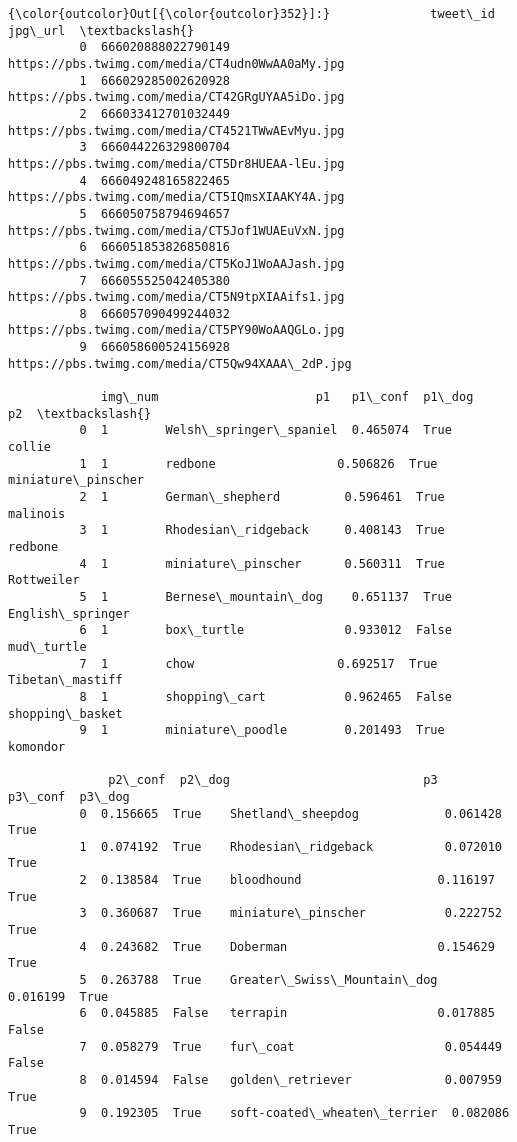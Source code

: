 \documentclass[11pt]{article}
\begin{document}
\begin{Verbatim}[commandchars=\\\{\}]
{\color{outcolor}Out[{\color{outcolor}352}]:}              tweet\_id                                          jpg\_url  \textbackslash{}
          0  666020888022790149  https://pbs.twimg.com/media/CT4udn0WwAA0aMy.jpg   
          1  666029285002620928  https://pbs.twimg.com/media/CT42GRgUYAA5iDo.jpg   
          2  666033412701032449  https://pbs.twimg.com/media/CT4521TWwAEvMyu.jpg   
          3  666044226329800704  https://pbs.twimg.com/media/CT5Dr8HUEAA-lEu.jpg   
          4  666049248165822465  https://pbs.twimg.com/media/CT5IQmsXIAAKY4A.jpg   
          5  666050758794694657  https://pbs.twimg.com/media/CT5Jof1WUAEuVxN.jpg   
          6  666051853826850816  https://pbs.twimg.com/media/CT5KoJ1WoAAJash.jpg   
          7  666055525042405380  https://pbs.twimg.com/media/CT5N9tpXIAAifs1.jpg   
          8  666057090499244032  https://pbs.twimg.com/media/CT5PY90WoAAQGLo.jpg   
          9  666058600524156928  https://pbs.twimg.com/media/CT5Qw94XAAA\_2dP.jpg   
          
             img\_num                      p1   p1\_conf  p1\_dog                  p2  \textbackslash{}
          0  1        Welsh\_springer\_spaniel  0.465074  True    collie               
          1  1        redbone                 0.506826  True    miniature\_pinscher   
          2  1        German\_shepherd         0.596461  True    malinois             
          3  1        Rhodesian\_ridgeback     0.408143  True    redbone              
          4  1        miniature\_pinscher      0.560311  True    Rottweiler           
          5  1        Bernese\_mountain\_dog    0.651137  True    English\_springer     
          6  1        box\_turtle              0.933012  False   mud\_turtle           
          7  1        chow                    0.692517  True    Tibetan\_mastiff      
          8  1        shopping\_cart           0.962465  False   shopping\_basket      
          9  1        miniature\_poodle        0.201493  True    komondor             
          
              p2\_conf  p2\_dog                           p3   p3\_conf  p3\_dog  
          0  0.156665  True    Shetland\_sheepdog            0.061428  True    
          1  0.074192  True    Rhodesian\_ridgeback          0.072010  True    
          2  0.138584  True    bloodhound                   0.116197  True    
          3  0.360687  True    miniature\_pinscher           0.222752  True    
          4  0.243682  True    Doberman                     0.154629  True    
          5  0.263788  True    Greater\_Swiss\_Mountain\_dog   0.016199  True    
          6  0.045885  False   terrapin                     0.017885  False   
          7  0.058279  True    fur\_coat                     0.054449  False   
          8  0.014594  False   golden\_retriever             0.007959  True    
          9  0.192305  True    soft-coated\_wheaten\_terrier  0.082086  True    
\end{Verbatim}
            
\end{document}
